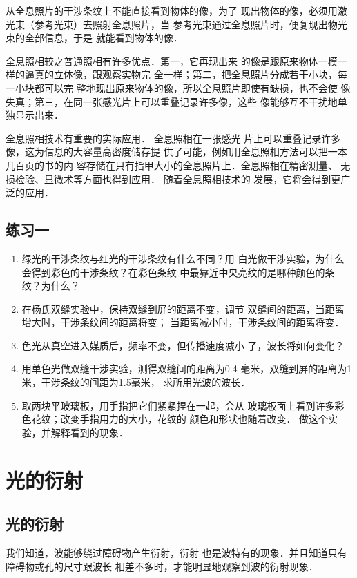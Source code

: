 从全息照片的干涉条纹上不能直接看到物体的像，为了
现出物体的像，必须用激光束（参考光束）去照射全息照片，当
参考光束通过全息照片时，便复现出物光束的全部信息，于是
就能看到物体的像．

全息照相较之普通照相有许多优点．第一，它再现出来
的像是跟原来物体一模一样的逼真的立体像，跟观察实物完
全一样；第二，把全息照片分成若干小块，每一小块都可以完
整地现出原来物体的像，所以全息照片即使有缺损，也不会使
像失真；第三，在同一张感光片上可以重叠记录许多像，这些
像能够互不干扰地单独显示出来．

全息照相技术有重要的实际应用．
全息照相在一张感光
片上可以重叠记录许多像，这为信息的大容量高密度储存提
供了可能，例如用全息照相方法可以把一本几百页的书的内
容存储在只有指甲大小的全息照片上．全息照相在精密测量、
无损检验、显微术等方面也得到应用．
随着全息照相技术的
发展，它将会得到更广泛的应用．

\subsection*{练习一}

\begin{enumerate}
\item 绿光的干涉条纹与红光的干涉条纹有什么不同？用
白光做干涉实验，为什么会得到彩色的干涉条纹？在彩色条纹
中最靠近中央亮纹的是哪种颜色的条纹？为什么？
\item 在杨氏双缝实验中，保持双缝到屏的距离不变，调节
双缝间的距离，当距离增大时，干涉条纹间的距离将变\underline{\qquad}；
当距离减小时，干涉条纹间的距离将变\underline{\qquad}．
\item 色光从真空进入媒质后，频率不变，但传播速度减小
了，波长将如何变化？
\item 用单色光做双缝干涉实验，测得双缝间的距离为0.4
毫米，双缝到屏的距离为1米，干涉条纹的间距为1.5毫米，
求所用光波的波长．
\item 取两块平玻璃板，用手指把它们紧紧捏在一起，会从
玻璃板面上看到许多彩色花纹；改变手指用力的大小，花纹的
颜色和形状也随着改变．
做这个实验，并解释看到的现象．
\end{enumerate}

\section{光的衍射}
\subsection{光的衍射}

我们知道，波能够绕过障碍物产生衍射，衍射
也是波特有的现象．并且知道只有障碍物或孔的尺寸跟波长
相差不多时，才能明显地观察到波的衍射现象．

